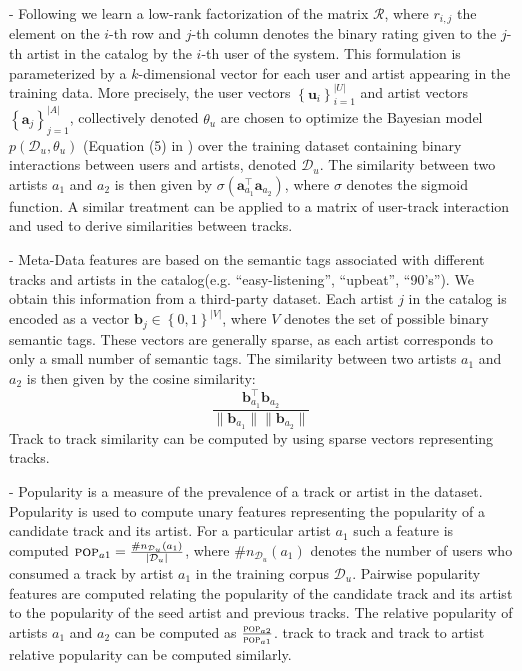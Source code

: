  -
Following \cite{xbox-www} we learn a low-rank factorization of the matrix $\mathcal{R}$,
 where $r_{i,j}$ the element on the $i$-th row and $j$-th column denotes the binary rating given to the $j$-th artist in the catalog by the $i$-th user of the system. This formulation is parameterized by a $k$-dimensional vector for each user and artist appearing in the training data. More precisely, the user vectors $\left\{\mathbf{u}_i\right\}_{i=1}^{|U|}$ and artist vectors $\left\{\mathbf{a}_j\right\}_{j=1}^{|A|}$, collectively denoted $\theta_u$ are chosen to optimize the Bayesian model $p(\mathcal{D}_u,\theta_u)$ (Equation (5) in \cite{xbox-www}) over the training dataset containing binary interactions between users and artists, denoted $\mathcal{D}_u$.  The similarity between two artists $a_1$ and $a_2$ is then given by $\sigma \left(\mathbf{a}_{a_1}^\top\mathbf{a}_{a_2}\right)$, where $\sigma$ denotes the sigmoid function. A similar treatment can be applied to a matrix of user-track interaction and used to derive similarities between tracks.

 -
Meta-Data features are based on the semantic tags associated with different tracks and artists in the catalog(e.g. ``easy-listening'', ``upbeat'', ``90's''). We obtain this information from a third-party dataset. Each artist $j$ in the catalog is  encoded as a vector $\mathbf{b}_j \in \left\{0,1\right\}^{|V|}$, where $V$ denotes the set of  possible binary semantic tags. These vectors are generally sparse, as each artist corresponds to only a small number of semantic tags.  The similarity between two artists $a_1$ and $a_2$ is then given by the cosine similarity: 
$$\frac{\mathbf{b}_{a_1}^\top\mathbf{b}_{a_2}}{\parallel\mathbf{b}_{a_1}\parallel\parallel\mathbf{b}_{a_2}\parallel}$$
Track to track similarity can be computed by using sparse vectors representing tracks.

 -
Popularity is a measure of the prevalence of a track or artist in the dataset.
Popularity is used to compute unary features representing the popularity of a candidate track and its artist. For a particular artist $a_1$ such a feature is computed $\textsc{pop}_{a1}=\frac{\#n_{\mathcal{D}_u}\left(a_1\right)}{|\mathcal{D}_u|}$, where $\#n_{\mathcal{D}_u}\left(a_1\right)$ denotes the number of users who consumed a track by artist $a_1$  in the training corpus $\mathcal{D}_u$. Pairwise popularity features are computed relating the popularity of the candidate track and its artist to the popularity of the seed artist and previous tracks. The relative popularity of artists $a_1$ and $a_2$ can be computed as $\frac{\textsc{pop}_{a2}}{\textsc{pop}_{a1}}$. track to track and track to artist relative popularity can be computed similarly.


